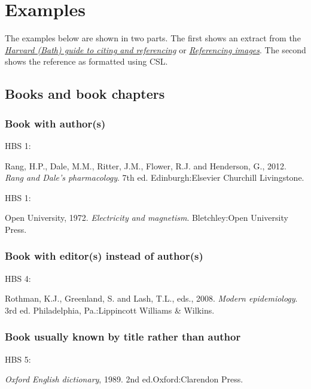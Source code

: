 \section{Examples}

The examples below are shown in two parts.
The first shows an extract from the
\href{https://library.bath.ac.uk/referencing/harvard-bath}{\emph{Harvard (Bath) guide to citing and referencing}} or
\href{http://www.bath.ac.uk/library/pass.bho/images-referencing.pdf}{\emph{Referencing images}}.
The second shows the reference as formatted using CSL.

\subsection{Books and book chapters}

\subsubsection*{Book with author(s)}

HBS 1: \cite{rang.etal2012rdp}

Rang, H.P., Dale, M.M., Ritter, J.M., Flower, R.J. and Henderson, G., 2012. \emph{Rang and Dale's pharmacology}. 7th ed. Edinburgh:\@ Elsevier Churchill Livingstone.


HBS 1: \cite{ou1972em}

Open University, 1972. \emph{Electricity and magnetism}. Bletchley:\@ Open University Press.



\subsubsection*{Book with editor(s) instead of author(s)}

HBS 4: \cite{rothman.etal2008me}

Rothman, K.J., Greenland, S. and Lash, T.L., eds., 2008. \emph{Modern epidemiology}. 3rd ed. Philadelphia, Pa.:\@ Lippincott Williams \& Wilkins.



\subsubsection*{Book usually known by title rather than author}

HBS 5: \cite{oed1989}

\emph{Oxford English dictionary}, 1989. 2nd ed.\@ Oxford:\@ Clarendon Press.



